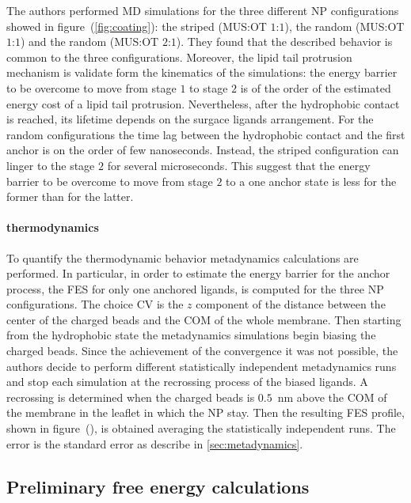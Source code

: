 \bigskip
The authors performed \ac{MD} simulations for the three different \ac{NP} configurations showed in figure~(\ref{fig:coating}): the striped (\ac{MUS}:\ac{OT} $1$:$1$), the random (\ac{MUS}:\ac{OT} $1$:$1$) and the random (\ac{MUS}:\ac{OT} $2$:$1$). They found that the described behavior is common to the three configurations. Moreover, the lipid tail protrusion mechanism is validate form the kinematics of the simulations: the energy barrier to be overcome to move from stage $1$ to stage $2$ is of the order of the estimated energy cost of a lipid tail protrusion. Nevertheless, after the hydrophobic contact is reached, its lifetime depends on the surgace ligands arrangement. For the random configurations the time lag between the hydrophobic contact and the first anchor is on the order of few nanoseconds. Instead, the striped configuration can linger to the stage $2$ for several microseconds. This suggest that the energy barrier to be overcome to move from stage $2$ to a one anchor state is less for the former than for the latter. 

\paragraph{\textbf{thermodynamics}} To quantify the thermodynamic behavior metadynamics calculations are performed. In particular, in order to estimate the energy barrier for the anchor process, the \ac{FES} for only one anchored ligands, is computed for the three \ac{NP} configurations. The choice \ac{CV} is the $z$ component of the distance between the center of the charged beads and the \ac{COM} of the whole membrane. Then starting from the hydrophobic state the metadynamics simulations begin biasing the charged beads. Since the achievement of the convergence it was not possible, the authors decide to perform different statistically independent metadynamics runs and stop each simulation at the recrossing process of the biased ligands. A recrossing is determined when the charged beads is $0.5$~nm above the \ac{COM} of the membrane in the leaflet in which the \ac{NP} stay. Then the resulting \ac{FES} profile, shown in figure~(), is obtained averaging the statistically independent runs. The error is the standard error as describe in \ref{sec:metadynamics}.

\subsection{Preliminary free energy calculations}






